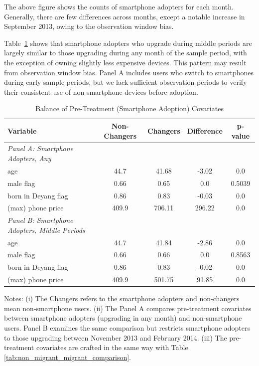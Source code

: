 The above figure shows the counts of smartphone adopters for each month. Generally, there are few differences across months, except a notable increase in September 2013, owing to the observation window bias.

Table~\ref{tab:non_changer_changer_comparison} shows that smartphone adopters who upgrade during middle periods are largely similar to those upgrading during any month of the sample period, with the exception of owning slightly less expensive devices.
This pattern may result from observation window bias.
Panel A includes users who switch to smartphones during early sample periods, but we lack sufficient observation periods to verify their consistent use of non-smartphone devices before adoption.


\begin{table}[htbp]
\vspace{0.5cm}
\renewcommand{\arraystretch}{1.6}
\setlength{\tabcolsep}{1.1mm}{}
\centering
\small
\caption{Balance of Pre-Treatment (Smartphone Adoption) Covariates}
\begin{tabular}{lcccc} \hline
Variable & Non-Changers & Changers & Difference & p-value \\ \hline
\textit{Panel A: Smartphone Adopters, Any} \\
age & 44.7 & 41.68 & -3.02 & 0.0 \\
male flag & 0.66 & 0.65 & 0.0 & 0.5039 \\
born in Deyang flag & 0.86 & 0.83 & -0.03 & 0.0 \\
(max) phone price & 409.9 & 706.11 & 296.22 & 0.0 \\ \hline

\textit{Panel B: Smartphone Adopters, Middle Periods} \\
age & 44.7 & 41.84 & -2.86 & 0.0 \\
male flag & 0.66 & 0.66 & 0.0 & 0.8563 \\
born in Deyang flag & 0.86 & 0.83 & -0.02 & 0.0 \\
(max) phone price & 409.9 & 501.75 & 91.85 & 0.0 \\ \hline

\end{tabular}
\label{tab:non_changer_changer_comparison}%
\end{table}%

\vspace{-2em}
\begin{singlespace}
\begin{footnotesize}
\noindent Notes: (i) The Changers refers to the smartphone adopters and non-changers mean non-smartphone users. (ii) The Panel A compares pre-treatment covariates between smartphone adopters (upgrading in any month) and non-smartphone users. Panel B examines the same comparison but restricts smartphone adopters to those upgrading between November 2013 and February 2014. (iii) The pre-treatment covariates are crafted in the same way with Table \ref{tab:non_migrant_migrant_comparison}.
\end{footnotesize}
\end{singlespace}


